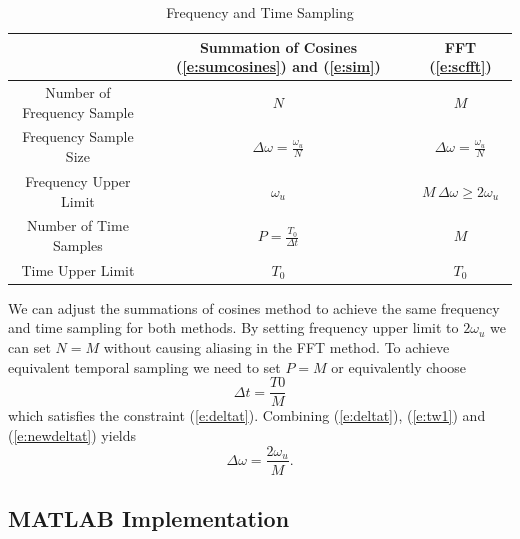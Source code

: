 \documentclass[11pt]{article}
\begin{document}
\begin{table}[!ht]
\renewcommand{\arraystretch}{1.3}
\caption{Frequency and Time Sampling}
\label{t:compare}
\centering
\begin{tabular}{c|c|c}
\hline
& \bfseries Summation of Cosines  (\ref{e:sumcosines}) and (\ref{e:sim}) & \bfseries FFT (\ref{e:scfft})\\
\hline\hline
Number of Frequency Sample & $N$ & $M$ \\ \hline
Frequency Sample Size  &  $\Delta \omega = \frac{\omega_{u}}{N}$ & $\Delta \omega = \frac{\omega_{u}}{N}$ \\ \hline
  Frequency Upper Limit & $ \omega_u$ & $ M \, \Delta\omega \geq2 \omega_u$ \\ \hline
  Number of Time Samples & $P=\frac{T_0}{\Delta t}$ & $M$ \\ \hline
  Time Upper Limit & $T_0$ & $T_0$ \\
\hline
\end{tabular}
\end{table}

We can adjust the summations of cosines method to achieve the same frequency and time sampling for both methods.  By setting frequency upper limit to  $2\omega_u$ we can set $N=M$ without causing aliasing in the FFT method.  To achieve equivalent temporal sampling we need to set $P=M$ or equivalently choose
\begin{equation}
  \Delta t = \frac{T0}{M}
  \label{e:newdeltat}
\end{equation}
which satisfies the constraint (\ref{e:deltat}).  Combining (\ref{e:deltat}), (\ref{e:tw1}) and (\ref{e:newdeltat}) yields
\begin{equation}
  \Delta \omega = \frac{2 \omega_u}{M}.
\end{equation}

\subsection{MATLAB Implementation}
\end{document}
